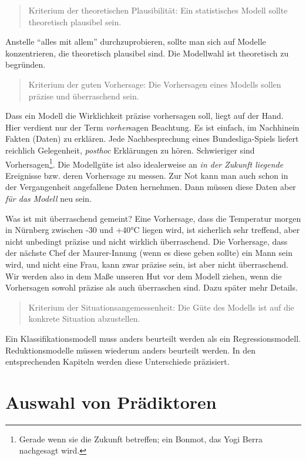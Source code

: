 \documentclass[12pt,ngerman,]{book}
\let\rmarkdownfootnote\footnote%
\def\footnote{\protect\rmarkdownfootnote}
\theoremstyle{definition}
\theoremstyle{definition}
\theoremstyle{remark}
\begin{document}
\begin{quote}
Kriterium der theoretischen Plausibilität: Ein statistisches Modell
sollte theoretisch plausibel sein.
\end{quote}

Anstelle ``alles mit allem'' durchzuprobieren, sollte man sich auf
Modelle konzentrieren, die theoretisch plausibel sind. Die Modellwahl
ist theoretisch zu begründen.

\begin{quote}
Kriterium der guten Vorhersage: Die Vorhersagen eines Modells sollen
präzise und überraschend sein.
\end{quote}

Dass ein Modell die Wirklichkeit präzise vorhersagen soll, liegt auf der
Hand. Hier verdient nur der Term \emph{vorher}sagen Beachtung. Es ist
einfach, im Nachhinein Fakten (Daten) zu erklären. Jede Nachbesprechung
eines Bundesliga-Spiels liefert reichlich Gelegenheit, \emph{posthoc}
Erklärungen zu hören. Schwieriger sind Vorhersagen\footnote{Gerade wenn
  sie die Zukunft betreffen; ein Bonmot, das Yogi Berra nachgesagt wird.}.
Die Modellgüte ist also idealerweise an \emph{in der Zukunft liegende}
Ereignisse bzw. deren Vorhersage zu messen. Zur Not kann man auch schon
in der Vergangenheit angefallene Daten hernehmen. Dann müssen diese
Daten aber \emph{für das Modell} neu sein.

Was ist mit überraschend gemeint? Eine Vorhersage, dass die Temperatur
morgen in Nürnberg zwischen -30 und +40°C liegen wird, ist sicherlich
sehr treffend, aber nicht unbedingt präzise und nicht wirklich
überraschend. Die Vorhersage, dass der nächste Chef der Maurer-Innung
(wenn es diese geben sollte) ein Mann sein wird, und nicht eine Frau,
kann zwar präzise sein, ist aber nicht überraschend. Wir werden also in
dem Maße unseren Hut vor dem Modell ziehen, wenn die Vorhersagen sowohl
präzise als auch überraschen sind. Dazu später mehr Details.

\begin{quote}
Kriterium der Situationsangemessenheit: Die Güte des Modells ist auf die
konkrete Situation abzustellen.
\end{quote}

Ein Klassifikationsmodell muss anders beurteilt werden als ein
Regressionsmodell. Reduktionsmodelle müssen wiederum anders beurteilt
werden. In den entsprechenden Kapiteln werden diese Unterschiede
präzisiert.

\section{Auswahl von Prädiktoren}\label{auswahl-von-pradiktoren}
\end{document}
